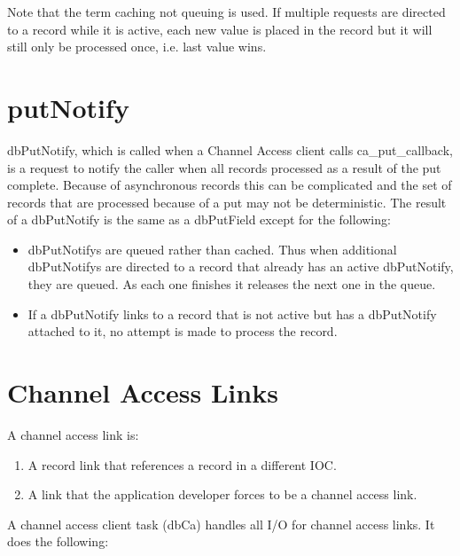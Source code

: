 Note that the term caching not queuing is used. If multiple requests are directed to a record while it is active, each new 
value is placed in the record but it will still only be processed once, i.e. last value wins.

\section{putNotify}

dbPutNotify, which is called when a Channel Access client calls ca\_put\_callback, is a request to notify the caller when all 
records processed as a result of the put complete. Because of asynchronous records this can be complicated and the set of 
records that are processed because of a put may not be deterministic. The result of a dbPutNotify is the same as a 
dbPutField except for the following:

\begin{itemize}\item dbPutNotifys are queued rather than cached. Thus when additional dbPutNotifys are directed to a record that 
already has an active dbPutNotify, they are queued. As each one finishes it releases the next one in the queue.

\item If a dbPutNotify links to a record that is not active but has a dbPutNotify attached to it, no attempt is made to 
process the record.

\end{itemize}\section{Channel Access Links}

A channel access link is:

\begin{enumerate}\item A record link that references a record in a different IOC.

\item A link that the application developer forces to be a channel access link.

\end{enumerate}A channel access client task (dbCa)  handles all I/O for channel access links. It does the following:

